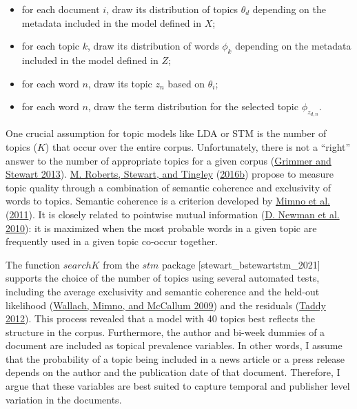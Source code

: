 \documentclass[
  12pt,
]{article}
\providecommand{\tightlist}{%
  \setlength{\itemsep}{0pt}\setlength{\parskip}{0pt}}
\begin{document}
\begin{itemize}
\tightlist
\item
  for each document \(i\), draw its distribution of topics \(\theta_d\)
  depending on the metadata included in the model defined in \(X\);
\item
  for each topic \(k\), draw its distribution of words \(\phi_k\)
  depending on the metadata included in the model defined in \(Z\);
\item
  for each word \(n\), draw its topic \(z_n\) based on \(\theta_i\);
\item
  for each word \(n\), draw the term distribution for the selected topic
  \(\phi_{z_{d,n}}\).
\end{itemize}

One crucial assumption for topic models like LDA or STM is the number of
topics (\(K\)) that occur over the entire corpus. Unfortunately, there
is not a ``right'' answer to the number of appropriate topics for a
given corpus (\protect\hyperlink{ref-grimmer_text_2013}{Grimmer and
Stewart 2013}). \protect\hyperlink{ref-roberts_stm:_2016}{M. Roberts,
Stewart, and Tingley} (\protect\hyperlink{ref-roberts_stm:_2016}{2016b})
propose to measure topic quality through a combination of semantic
coherence and exclusivity of words to topics. Semantic coherence is a
criterion developed by
\protect\hyperlink{ref-mimno_optimizing_2011}{Mimno et al.}
(\protect\hyperlink{ref-mimno_optimizing_2011}{2011}). It is closely
related to pointwise mutual information
(\protect\hyperlink{ref-newman_automatic_2010}{D. Newman et al. 2010}):
it is maximized when the most probable words in a given topic are
frequently used in a given topic co-occur together.

The function \(searchK\) from the \(stm\) package
{[}stewart\_bstewartstm\_2021{]} supports the choice of the number of
topics using several automated tests, including the average exclusivity
and semantic coherence and the held-out likelihood
(\protect\hyperlink{ref-wallach_rethinking_2009}{Wallach, Mimno, and
McCallum 2009}) and the residuals
(\protect\hyperlink{ref-taddy_estimation_2012}{Taddy 2012}). This
process revealed that a model with 40 topics best reflects the structure
in the corpus. Furthermore, the author and bi-week dummies of a document
are included as topical prevalence variables. In other words, I assume
that the probability of a topic being included in a news article or a
press release depends on the author and the publication date of that
document. Therefore, I argue that these variables are best suited to
capture temporal and publisher level variation in the documents.
\end{document}
